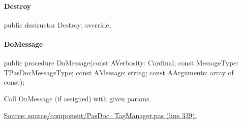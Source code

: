 \documentclass{report}
\newif\ifpdf
\begin{document}
\paragraph*{Destroy}\hspace*{\fill}

\label{PasDoc_TagManager.TTagManager-Destroy}
\begin{list}{}{
\setlength{\itemindent}{0cm}
\setlength{\listparindent}{0cm}
\setlength{\leftmargin}{\evensidemargin}
\addtolength{\leftmargin}{\tmplength}
\settowidth{\labelsep}{X}
\addtolength{\leftmargin}{\labelsep}
\setlength{\labelwidth}{\tmplength}
}
\item[\textbf{Declaration}\hfill]
\ifpdf
\begin{flushleft}
\fi
\begin{ttfamily}
public destructor Destroy; override;\end{ttfamily}

\ifpdf
\end{flushleft}
\fi

\end{list}
\paragraph*{DoMessage}\hspace*{\fill}

\label{PasDoc_TagManager.TTagManager-DoMessage}
\begin{list}{}{
\setlength{\itemindent}{0cm}
\setlength{\listparindent}{0cm}
\setlength{\leftmargin}{\evensidemargin}
\addtolength{\leftmargin}{\tmplength}
\settowidth{\labelsep}{X}
\addtolength{\leftmargin}{\labelsep}
\setlength{\labelwidth}{\tmplength}
}
\item[\textbf{Declaration}\hfill]
\ifpdf
\begin{flushleft}
\fi
\begin{ttfamily}
public procedure DoMessage(const AVerbosity: Cardinal; const MessageType: TPasDocMessageType; const AMessage: string; const AArguments: array of const);\end{ttfamily}

\ifpdf
\end{flushleft}
\fi

\par
\item[\textbf{Description}]
Call OnMessage (if assigned) with given params.\par
\href{https://github.com/pasdoc/pasdoc/blob/master/source/component/PasDoc_TagManager.pas#L339}{Source: source/component/PasDoc{\_}TagManager.pas (line 339).}

\end{list}
\end{document}

